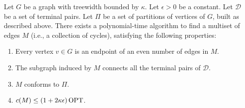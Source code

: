 \begin{ftheo}\label{dynamicProgramming}

Let \(G\) be a graph with treewidth bounded by \(\kappa\). Let \(\epsilon > 0\) be a constant. Let \(\mathcal{D}\) be a set of terminal pairs. Let \(\Pi\) be a set of partitions of vertices of \(G\), built as described above.
There exists a polynomial-time algorithm to find a multiset of edges \(M\) (i.e., a collection of cycles), satisfying the following properties:
\begin{enumerate}
    \item Every vertex \(v \in G\) is an endpoint of an even number of edges in \(M\).
    \item The subgraph induced by \(M\) connects all the terminal pairs of \(\mathcal{D}\).
    \item \(M\) conforms to \(\Pi\).
    \item \(c(M) \leq (1 + 2 \kappa \epsilon) \operatorname{\textrm{OPT}}\).
\end{enumerate}

\end{ftheo}
